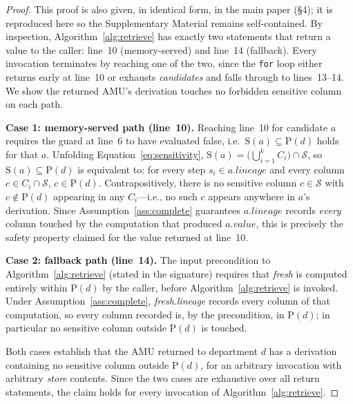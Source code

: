 \documentclass[9pt,twocolumn,twoside]{extarticle}
\begin{document}
\begin{proof}
This proof is also given, in identical form, in the main paper (\S4); it is
reproduced here so the Supplementary Material remains self-contained.
By inspection, Algorithm~\ref{alg:retrieve} has exactly two statements that
return a value to the caller: line~10 (memory-served) and line~14 (fallback).
Every invocation terminates by reaching one of the two, since the
\texttt{for} loop either returns early at line~10 or exhausts \textit{candidates}
and falls through to lines~13--14.
We show the returned AMU's derivation touches no forbidden sensitive column
on each path.

\smallskip\noindent\textbf{Case 1: memory-served path (line~10).}
Reaching line~10 for candidate $a$ requires the guard at line~6 to have
evaluated false, i.e.\ $\mathrm{S}(a) \subseteq \mathrm{P}(d)$ holds for that
$a$.
Unfolding Equation~\ref{eq:sensitivity},
$\mathrm{S}(a) = \bigl(\bigcup_{i=1}^{k} C_i\bigr) \cap \mathcal{S}$, so
$\mathrm{S}(a) \subseteq \mathrm{P}(d)$ is equivalent to: for every step
$s_i \in a.\mathit{lineage}$ and every column $c \in C_i \cap \mathcal{S}$,
$c \in \mathrm{P}(d)$.
Contrapositively, there is no sensitive column $c \in \mathcal{S}$ with
$c \notin \mathrm{P}(d)$ appearing in any $C_i$---i.e., no such $c$ appears
anywhere in $a$'s derivation.
Since Assumption~\ref{ass:complete} guarantees $a.\mathit{lineage}$ records
\emph{every} column touched by the computation that produced $a.value$, this
is precisely the safety property claimed for the value returned at line~10.

\smallskip\noindent\textbf{Case 2: fallback path (line~14).}
The input precondition to Algorithm~\ref{alg:retrieve} (stated in the
signature) requires that \textit{fresh} is computed entirely within
$\mathrm{P}(d)$ by the caller, before Algorithm~\ref{alg:retrieve} is
invoked.
Under Assumption~\ref{ass:complete}, \textit{fresh}.\textit{lineage} records
every column of that computation, so every column recorded is, by the
precondition, in $\mathrm{P}(d)$; in particular no sensitive column outside
$\mathrm{P}(d)$ is touched.

\smallskip\noindent
Both cases establish that the AMU returned to department $d$ has a derivation
containing no sensitive column outside $\mathrm{P}(d)$, for an arbitrary
invocation with arbitrary \textit{store} contents.
Since the two cases are exhaustive over all return statements, the claim
holds for every invocation of Algorithm~\ref{alg:retrieve}.
\end{proof}
\end{document}
